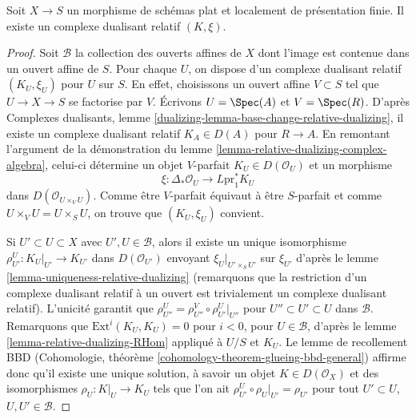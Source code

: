 \begin{lemma}
\label{lemma-existence-relative-dualizing}
Soit $X \to S$ un morphisme de schémas plat et localement de présentation finie. Il existe un complexe dualisant relatif $(K, \xi)$.
\end{lemma}

\begin{proof}
Soit $\mathcal{B}$ la collection des ouverts affines de $X$ dont l'image est contenue dans un ouvert affine de $S$. Pour chaque $U$, on dispose d'un complexe dualisant relatif $(K_U, \xi_U)$ pour $U$ sur $S$. En effet, choisissons un ouvert affine $V \subset S$ tel que $U \to X \to S$ se factorise par $V$. Écrivons $U = \Spec(A)$ et $V = \Spec(R)$. D'après Complexes dualisants, lemme \ref{dualizing-lemma-base-change-relative-dualizing}, il existe un complexe dualisant relatif $K_A \in D(A)$ pour $R \to A$. En remontant l'argument de la démonstration du lemme \ref{lemma-relative-dualizing-complex-algebra}, celui-ci détermine un objet $V$-parfait $K_U \in D(\mathcal{O}_U)$ et un morphisme
$$
\xi : \Delta_*\mathcal{O}_U \to L\text{pr}_1^*K_U
$$
dans $D(\mathcal{O}_{U \times_V U})$. Comme être $V$-parfait équivaut à être $S$-parfait et comme $U \times_V U = U \times_S U$, on trouve que $(K_U, \xi_U)$ convient.

\medskip\noindent
Si $U' \subset U \subset X$ avec $U', U \in \mathcal{B}$, alors il existe un unique isomorphisme $\rho_{U'}^U : K_U|_{U'} \to K_{U'}$ dans $D(\mathcal{O}_{U'})$ envoyant $\xi_U|_{U' \times_S U'}$ sur $\xi_{U'}$ d'après le lemme \ref{lemma-uniqueness-relative-dualizing} (remarquons que la restriction d'un complexe dualisant relatif à un ouvert est trivialement un complexe dualisant relatif). L'unicité garantit que
$\rho^U_{U''} = \rho^V_{U''} \circ \rho ^U_{U'}|_{U''}$
pour $U'' \subset U' \subset U$ dans $\mathcal{B}$. Remarquons que $\text{Ext}^i(K_U, K_U) = 0$ pour $i < 0$, pour $U \in \mathcal{B}$, d'après le lemme \ref{lemma-relative-dualizing-RHom} appliqué à $U/S$ et $K_U$. Le lemme de recollement BBD (Cohomologie, théorème \ref{cohomology-theorem-glueing-bbd-general}) affirme donc qu'il existe une unique solution, à savoir un objet $K \in D(\mathcal{O}_X)$ et des isomorphismes $\rho_U : K|_U \to K_U$ tels que l'on ait $\rho^U_{U'} \circ \rho_U|_{U'} = \rho_{U'}$ pour tout $U' \subset U$, $U, U' \in \mathcal{B}$.


\end{proof}
